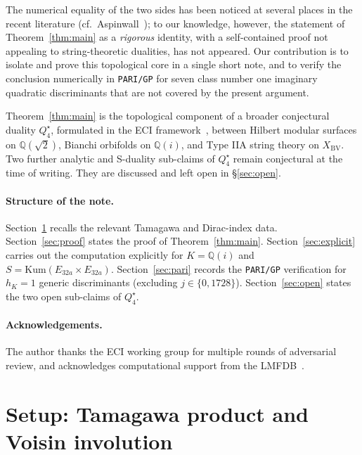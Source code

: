 \documentclass[11pt,a4paper]{article}
\theoremstyle{plain}
\theoremstyle{definition}
\newcommand{\Q}{\mathbb{Q}}
\begin{document}
The numerical equality of the two sides has been noticed at several places
in the recent literature (cf.~Aspinwall~\cite{Aspinwall1996}); to our
knowledge, however, the statement of Theorem~\ref{thm:main} as a
\emph{rigorous} identity, with a self-contained proof not appealing to
string-theoretic dualities, has not appeared. Our contribution is to
isolate and prove this topological core in a single short note, and to
verify the conclusion numerically in \texttt{PARI/GP} for seven class
number one imaginary quadratic discriminants that are not covered by the
present argument.

Theorem~\ref{thm:main} is the topological component of a broader
conjectural duality $Q_{4}^{\star}$, formulated in the
ECI framework~\cite{ECI2026}, between Hilbert modular surfaces on
$\Q(\sqrt 2)$, Bianchi orbifolds on $\Q(i)$, and Type IIA string theory
on $X_{\mathrm{BV}}$. Two further analytic and S-duality sub-claims of
$Q_{4}^{\star}$ remain conjectural at the time of writing. They are
discussed and left open in \S\ref{sec:open}.

\paragraph{Structure of the note.}
Section~\ref{sec:setup} recalls the relevant Tamagawa and Dirac-index
data. Section~\ref{sec:proof} states the proof of Theorem~\ref{thm:main}.
Section~\ref{sec:explicit} carries out the computation explicitly for
$K=\Q(i)$ and $S=\mathrm{Kum}(E_{32a}\times E_{32a})$. Section~\ref{sec:pari}
records the \texttt{PARI/GP} verification for $h_{K}=1$ generic discriminants
(excluding $j\in\{0,1728\}$). Section~\ref{sec:open} states the two
open sub-claims of $Q_{4}^{\star}$.

\paragraph{Acknowledgements.} The author thanks the ECI working group for
multiple rounds of adversarial review, and acknowledges computational
support from the LMFDB~\cite{LMFDB}.

\section{Setup: Tamagawa product and Voisin involution}
\label{sec:setup}
\end{document}
